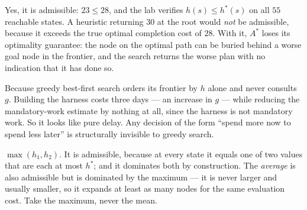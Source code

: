 \begin{ans}
  \item Yes, it is admissible: $23 \le 28$, and the lab verifies
        $h(s) \le h^{*}(s)$ on all $55$ reachable states. A heuristic returning
        $30$ at the root would \emph{not} be admissible, because it exceeds the
        true optimal completion cost of $28$. With it, $A^{*}$ loses its optimality
        guarantee: the node on the optimal path can be buried behind a worse goal
        node in the frontier, and the search returns the worse plan with no
        indication that it has done so.
  \item Because greedy best-first search orders its frontier by $h$ alone and never
        consults $g$. Building the harness costs three days --- an increase in $g$
        --- while reducing the mandatory-work estimate by nothing at all, since the
        harness is not mandatory work. So it looks like pure delay. Any decision of
        the form ``spend more now to spend less later'' is structurally invisible
        to greedy search.
  \item $\max(h_{1}, h_{2})$. It is admissible, because at every state it equals
        one of two values that are each at most $h^{*}$; and it dominates both by
        construction. The \emph{average} is also admissible but is dominated by the
        maximum --- it is never larger and usually smaller, so it expands at least
        as many nodes for the same evaluation cost. Take the maximum, never the
        mean.
\end{ans}

